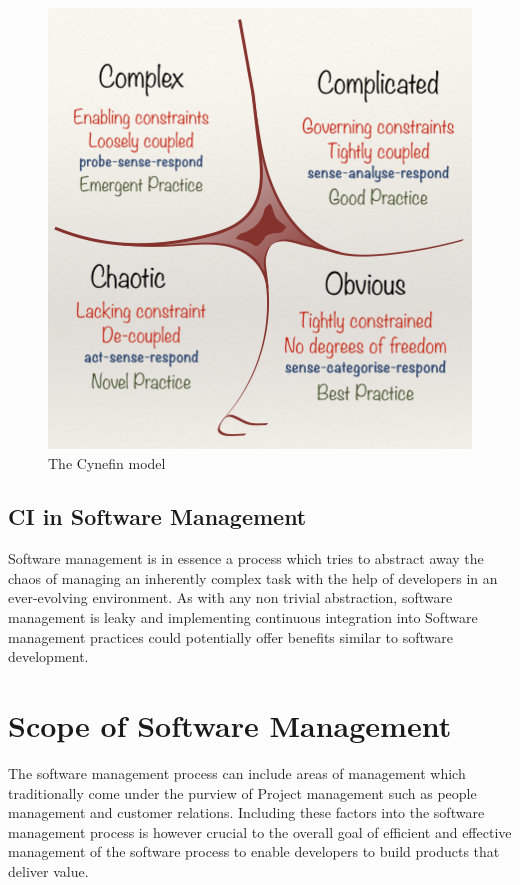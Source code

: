 \documentclass[12pt,conference]{IEEEtran}
\begin{document}
\begin{figure}[hbtp]
\includegraphics[scale=0.6]{cynefin.png}
\caption{The Cynefin model}
\end{figure}

\subsection*{CI in Software Management}

Software management is in essence a process which tries to abstract away the chaos of managing an inherently complex task with the help of developers in an ever-evolving environment. As with any non trivial abstraction, software management is leaky and implementing continuous integration into Software management practices could potentially offer benefits similar to software development.


\section*{Scope of Software Management}

The software management process can include areas of management which traditionally come under the purview of Project management such as people management and customer relations. Including these factors into the software management process is however crucial to the overall goal of efficient and effective management of the software process to enable developers to build products that deliver value.
\end{document}
